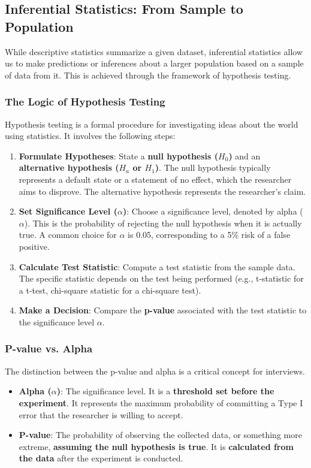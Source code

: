\documentclass[11pt,a4paper]{article}
\begin{document}
\subsection{Inferential Statistics: From Sample to Population}

While descriptive statistics summarize a given dataset, inferential statistics allow us to make predictions or inferences about a larger population based on a sample of data from it. This is achieved through the framework of hypothesis testing.

\subsubsection{The Logic of Hypothesis Testing}

Hypothesis testing is a formal procedure for investigating ideas about the world using statistics. It involves the following steps:
\begin{enumerate}
    \item \textbf{Formulate Hypotheses}: State a \textbf{null hypothesis ($H_0$)} and an \textbf{alternative hypothesis ($H_a$ or $H_1$)}. The null hypothesis typically represents a default state or a statement of no effect, which the researcher aims to disprove. The alternative hypothesis represents the researcher's claim.
    \item \textbf{Set Significance Level ($\alpha$)}: Choose a significance level, denoted by alpha ($\alpha$). This is the probability of rejecting the null hypothesis when it is actually true. A common choice for $\alpha$ is 0.05, corresponding to a 5\% risk of a false positive.
    \item \textbf{Calculate Test Statistic}: Compute a test statistic from the sample data. The specific statistic depends on the test being performed (e.g., t-statistic for a t-test, chi-square statistic for a chi-square test).
    \item \textbf{Make a Decision}: Compare the \textbf{p-value} associated with the test statistic to the significance level $\alpha$.
\end{enumerate}

\subsubsection{P-value vs. Alpha}

The distinction between the p-value and alpha is a critical concept for interviews.
\begin{itemize}
    \item \textbf{Alpha ($\alpha$)}: The significance level. It is a \textbf{threshold set before the experiment}. It represents the maximum probability of committing a Type I error that the researcher is willing to accept.
    \item \textbf{P-value}: The probability of observing the collected data, or something more extreme, \textbf{assuming the null hypothesis is true}. It is \textbf{calculated from the data} after the experiment is conducted.
\end{itemize}
\end{document}
